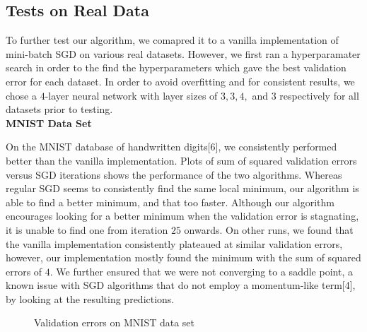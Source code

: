 \documentclass{article}
\begin{document}
\subsection{Tests on Real Data}
To further test our algorithm, we comapred it to a vanilla implementation of mini-batch SGD on various real datasets. However, we first ran a hyperparamater search in order to the find the hyperparameters which gave the best validation error for each dataset. In order to avoid overfitting and for consistent results, we chose a $ 4 $-layer neural network with layer sizes of $ 3, 3, 4, $ and $ 3 $ respectively for all datasets prior to testing.
\\

\textbf{MNIST Data Set}
\par On the MNIST database of handwritten digits[6], 
we consistently performed better than the vanilla implementation. Plots of sum of squared validation errors versus SGD iterations shows the performance of the two algorithms. Whereas regular SGD seems to consistently find the same local minimum, our algorithm is able to find a better minimum, and that too faster. Although our algorithm encourages looking for a better minimum when the validation error is stagnating, it is unable to find one from iteration $ 25 $ onwards. On other runs, we found that the vanilla implementation consistently plateaued at similar validation errors, however, our implementation mostly found the minimum with the sum of squared errors of $ 4 $. We further ensured that we were not converging to a saddle point, a known issue with SGD algorithms that do not employ a momentum-like term[4], by looking at the resulting predictions.
\begin{figure}[H]
	\centering
	\quad
	\caption{Validation errors on MNIST data set}%
	\label{MNIST}%
\end{figure}
\end{document}
